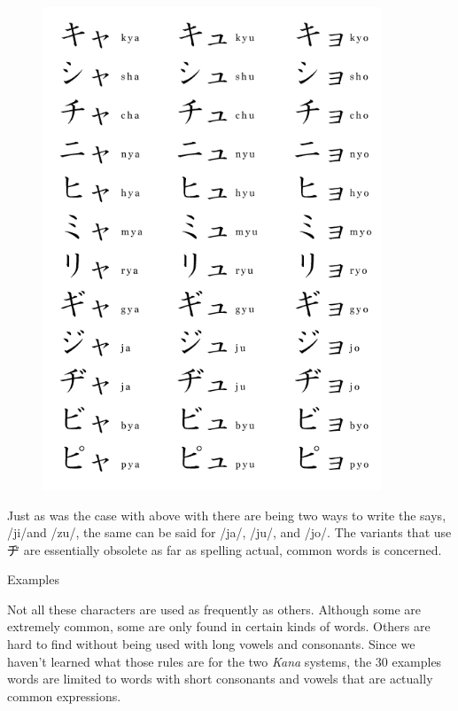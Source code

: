 \begin{figure}[h]
\centering

\includegraphics[width=0.9\textwidth]{figs/第01章/第4課:_katakana_fig/Katakana_yuoun_chart.png}

\end{figure}

\par{ Just as was the case with above with there are being two ways to write the says, \slash ji\slash  and \slash zu\slash , the same can be said for \slash ja\slash , \slash ju\slash , and \slash jo\slash . The variants that use ヂ are essentially obsolete as far as spelling actual, common words is concerned. }

\begin{center}
Examples  
\end{center}

\par{ Not all these characters are used as frequently as others. Although some are extremely common, some are only found in certain kinds of words. Others are hard to find without being used with long vowels and consonants. Since we haven't learned what those rules are for the two \emph{Kana }systems, the 30 examples words are limited to words with short consonants and vowels that are actually common expressions. }

